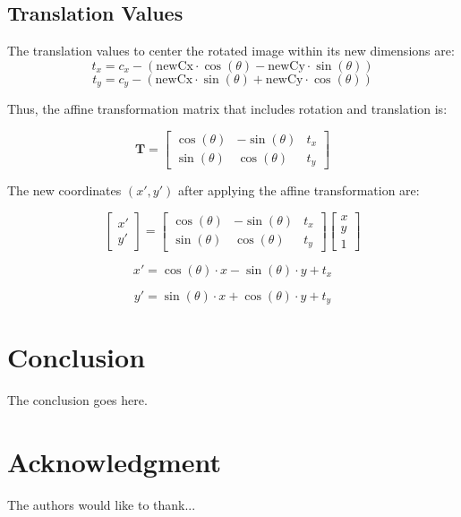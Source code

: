 \documentclass[conference]{IEEEtran}
\begin{document}
\subsection*{Translation Values}
The translation values to center the rotated image within its new dimensions are:
\[
t_x = c_x - (\text{newCx} \cdot \cos(\theta) - \text{newCy} \cdot \sin(\theta))
\]
\[
t_y = c_y - (\text{newCx} \cdot \sin(\theta) + \text{newCy} \cdot \cos(\theta))
\]

Thus, the affine transformation matrix that includes rotation and translation is:

\[
\mathbf{T} = \begin{bmatrix}
\cos(\theta) & -\sin(\theta) & t_x \\
\sin(\theta) & \cos(\theta) & t_y
\end{bmatrix}
\]

The new coordinates \((x', y')\) after applying the affine transformation are:

\[
\begin{bmatrix}
x' \\
y'
\end{bmatrix}
=
\begin{bmatrix}
\cos(\theta) & -\sin(\theta) & t_x \\
\sin(\theta) & \cos(\theta) & t_y
\end{bmatrix}
\begin{bmatrix}
x \\
y \\
1
\end{bmatrix}
\]

\[
x' = \cos(\theta) \cdot x - \sin(\theta) \cdot y + t_x
\]

\[
y' = \sin(\theta) \cdot x + \cos(\theta) \cdot y + t_y
\]

\cite{Weisstein_EricW.}



\section{Conclusion}
The conclusion goes here.






\section*{Acknowledgment}


The authors would like to thank...








  
 

\end{document}
